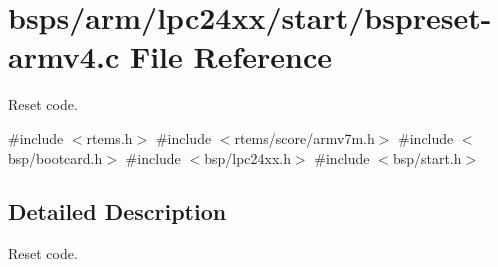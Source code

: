 \hypertarget{bspreset-armv4_8c}{}\section{bsps/arm/lpc24xx/start/bspreset-\/armv4.c File Reference}
\label{bspreset-armv4_8c}


Reset code.  


{\ttfamily \#include $<$rtems.\+h$>$}\newline
{\ttfamily \#include $<$rtems/score/armv7m.\+h$>$}\newline
{\ttfamily \#include $<$bsp/bootcard.\+h$>$}\newline
{\ttfamily \#include $<$bsp/lpc24xx.\+h$>$}\newline
{\ttfamily \#include $<$bsp/start.\+h$>$}\newline


\subsection{Detailed Description}
Reset code. 

